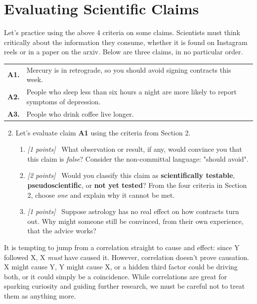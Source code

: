 \documentclass[11pt]{article}
\newcommand{\pts}[1]{\textit{[#1 points]}\ }
\begin{document}
\section{Evaluating Scientific Claims}
Let's practice using the above 4  criteria on some claims. Scientists must think critically about  the information they consume, whether it is found on Instagram reels or in a paper on the arxiv.
Below are three claims, in no particular order. 
\begin{center}
\begin{tabular}{@{}p{}p{}@{}}
\textbf{A1.} & Mercury is in retrograde, so you should avoid signing
contracts this week. \\[6pt]
\textbf{A2.} & People who sleep less than six hours a night are more likely
to report symptoms of depression. \\[6pt]
\textbf{A3.} & People who drink coffee live longer.
\end{tabular}
\end{center}
\begin{enumerate}
    \setcounter{enumi}{1}
    \item Let's evaluate claim \textbf{A1} using the criteria from Section 2.
    \begin{enumerate}[label=(\alph*)]
        \item \pts{1} What observation or result, if any, would convince you that this claim
        is \emph{false}?  Consider the non-committal language: "should avoid".
        \item \pts{2} Would you classify this claim as \textbf{scientifically
        testable}, \textbf{pseudoscientific}, or \textbf{not yet tested}?
        From the four criteria in Section 2, choose \textit{one} and explain why it cannot be met.
        \item \pts{1} Suppose astrology has no real effect on how contracts turn out.
        Why might someone still be convinced, from their own experience, that the
        advice works?
    \end{enumerate}
\end{enumerate}


It is tempting to jump from a correlation straight to cause and effect: since Y followed X, X \textit{must} have caused it. However, correlation doesn't prove causation. X might cause Y, Y might cause X, or a hidden third factor could be driving both, or it could simply be a coincidence. While correlations are great for sparking curiosity and guiding further research, we must be careful not to treat them as anything more.
\end{document}
